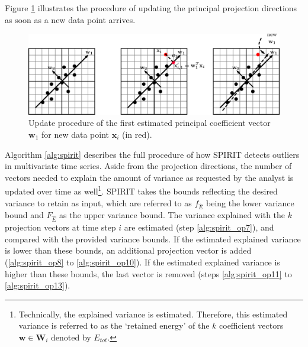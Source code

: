 Figure \ref{fig:reconstruction_updatew} illustrates the procedure of updating the principal projection directions as soon as a new data point arrives.

\begin{figure}[h]
	\centering
	\vspace{-0.12cm}
	\includegraphics[scale=1]{reconstruction-detection/SPIRIT_updateW}
	\caption{Update procedure of the first estimated principal coefficient vector $\mathbf{w}_1$ for new data point $\mathbf{x}_i$ (in red).}
	\label{fig:reconstruction_updatew}
\end{figure}

Algorithm \ref{alg:spirit} describes the full procedure of how SPIRIT detects outliers in multivariate time series.
Aside from the projection directions, the number of vectors needed to explain the amount of variance as requested by the analyst is updated over time as well\footnote{Technically, the explained variance is estimated. Therefore, this estimated variance is referred to as the `retained energy' of the $k$ coefficient vectors $\mathbf{w} \in \mathbf{W}_i$ denoted by $E_{tot}$.}. SPIRIT takes the bounds reflecting the desired variance to retain as input, which are referred to as $f_{\hat{E}}$ being the lower variance bound and $F_{\hat{E}}$ as the upper variance bound. The variance explained with the $k$ projection vectors at time step $i$ are estimated (step \ref{alg:spirit_op7}), and compared with the provided variance bounds. If the estimated explained variance is lower than these bounds, an additional projection vector is added (\ref{alg:spirit_op8} to \ref{alg:spirit_op10}). If the estimated explained variance is higher than these bounds, the last vector is removed (steps \ref{alg:spirit_op11} to \ref{alg:spirit_op13}).

